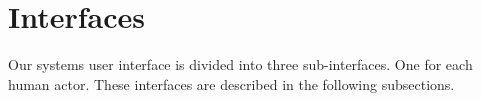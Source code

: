 \section{Interfaces}
\label{sec:interfaces}
Our systems user interface is divided into three sub-interfaces.
One for each human actor.
These interfaces are described in the following subsections.



